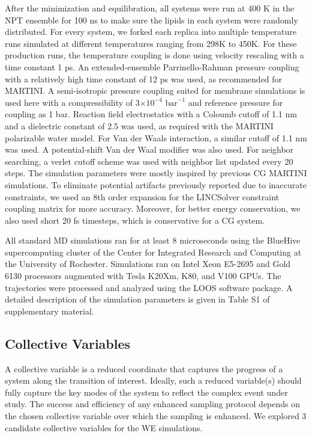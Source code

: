 \documentclass{biophys-new}
\begin{document}
After the minimization and equilibration, all systems were run at 400 K in the NPT ensemble for 100 ns to make sure the lipids in each system were randomly distributed.
For every system, we forked each replica into multiple temperature runs simulated at different temperatures ranging from 298K to 450K.
For these production runs, the temperature coupling is done using velocity rescaling\cite{Bussi2007} with a time constant 1 ps.
An extended-ensemble Parrinello-Rahman pressure coupling\cite{Parrinello1981} with a relatively high time constant of 12 ps was used, as recommended for MARTINI.  A semi-isotropic pressure coupling suited for membrane simulations is used here with a compressibility of 3$\times 10^{-4}$ $\text{bar}^{-1}$ and reference pressure for coupling as 1 bar.
Reaction field electrostatics with a Coloumb cutoff of 1.1 nm and a dielectric constant of 2.5 was used, as required with the MARTINI polarizable water model.
For Van der Waals interaction, a similar cutoff of 1.1 nm was used.
A potential-shift Van der Waal modifier was also used.
For neighbor searching, a verlet cutoff scheme was used with neighbor list updated every 20 steps.
The simulation parameters were mostly inspired by previous CG MARTINI simulations\cite{DeJong2016}. 
To eliminate potential artifacts previously reported due to inaccurate constraints\cite{Javanainen2020}, we used an 8th order expansion for the LINCSolver constraint coupling matrix\cite{Hess1997} for more accuracy.
Moreover, for better energy conservation, we also used short 20 fs timesteps, which is conservative for a CG system.

All standard MD simulations ran for at least 8 microseconds using the BlueHive supercomputing cluster of the Center for Integrated Research and Computing at the University of Rochester.
Simulations ran on Intel Xeon E5-2695 and Gold 6130 processors augmented with Tesla K20Xm, K80, and V100 GPUs.   
The trajectories were processed and analyzed using the LOOS software package\cite{Romo2014}.
A detailed description of the simulation parameters is given in Table S1 of supplementary material. 

\subsection*{Collective Variables}

A collective variable is a reduced coordinate that captures the progress of a system along the transition of interest.
Ideally, such a reduced variable(s) should fully capture the key modes of the system to reflect the complex event under study.
The success and efficiency of any enhanced sampling protocol depends on the chosen collective variable over which the sampling is enhanced\cite{Valsson2016, Yang2019b, Henin2022}. 
We explored 3 candidate collective variables for the WE simulations.
\end{document}
